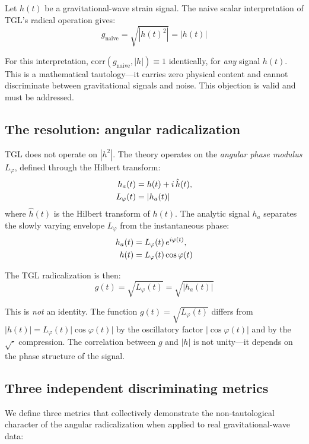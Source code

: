\documentclass[12pt,a4paper,twocolumn]{article}
\begin{document}
Let $h(t)$ be a gravitational-wave strain signal. The naive scalar interpretation of TGL's radical operation gives:
\begin{equation}
\label{eq:tautology}
g_{\text{naive}} = \sqrt{|h(t)^2|} = |h(t)|
\end{equation}

For this interpretation, $\text{corr}(g_{\text{naive}}, |h|) \equiv 1$ identically, for \emph{any} signal $h(t)$. This is a mathematical tautology---it carries zero physical content and cannot discriminate between gravitational signals and noise. This objection is valid and must be addressed.

\subsection{The resolution: angular radicalization}

TGL does not operate on $|h^2|$. The theory operates on the \emph{angular phase modulus} $L_\varphi$, defined through the Hilbert transform:
\begin{align}
\label{eq:angular}
h_a(t) &= h(t) + i\,\hat{h}(t), \notag\\
L_\varphi(t) &= |h_a(t)|
\end{align}
where $\hat{h}(t)$ is the Hilbert transform of $h(t)$. The analytic signal $h_a$ separates the slowly varying envelope $L_\varphi$ from the instantaneous phase:
\begin{align}
h_a(t) &= L_\varphi(t)\,e^{i\varphi(t)}, \notag\\
h(t) &= L_\varphi(t)\cos\varphi(t)
\end{align}

The TGL radicalization is then:
\begin{equation}
\label{eq:anti-tautology}
g(t) = \sqrt{L_\varphi(t)} = \sqrt{|h_a(t)|}
\end{equation}

This is \emph{not} an identity. The function $g(t) = \sqrt{L_\varphi(t)}$ differs from $|h(t)| = L_\varphi(t)|\cos\varphi(t)|$ by the oscillatory factor $|\cos\varphi(t)|$ and by the $\sqrt{\cdot}$ compression. The correlation between $g$ and $|h|$ is not unity---it depends on the phase structure of the signal.

\subsection{Three independent discriminating metrics}

We define three metrics that collectively demonstrate the non-tautological character of the angular radicalization when applied to real gravitational-wave data:
\end{document}
